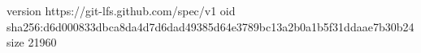 version https://git-lfs.github.com/spec/v1
oid sha256:d6d000833dbca8da4d7d6dad49385d64e3789bc13a2b0a1b5f31ddaae7b30b24
size 21960
